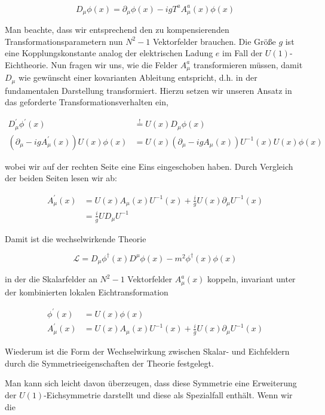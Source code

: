 \documentclass[10pt, letterpaper]{article}
\begin{document}
$$
D_{\mu} \phi(x)=\partial_{\mu} \phi(x)-i g T^{a} A_{\mu}^{a}(x) \phi(x)
$$

Man beachte, dass wir entsprechend den zu kompensierenden Transformationsparametern nun $N^{2}-1$ Vektorfelder brauchen. Die Größe $g$ ist eine Kopplungskonstante analog der elektrischen Ladung $e$ im Fall der $U(1)$-Eichtheorie. Nun fragen wir uns, wie die Felder $A_{\mu}^{a}$ transformieren müssen, damit $D_{\mu}$ wie gewünscht einer kovarianten Ableitung entspricht, d.h. in der fundamentalen Darstellung transformiert. Hierzu setzen wir unseren Ansatz in das geforderte Transformationsverhalten ein,

$$
\begin{aligned}
D_{\mu}^{\prime} \phi^{\prime}(x) & \stackrel{!}{=} U(x) D_{\mu} \phi(x) \\
\left(\partial_{\mu}-i g A_{\mu}^{\prime}(x)\right) U(x) \phi(x) & =U(x)\left(\partial_{\mu}-i g A_{\mu}(x)\right) U^{-1}(x) U(x) \phi(x)
\end{aligned}
$$

wobei wir auf der rechten Seite eine Eins eingeschoben haben. Durch Vergleich der beiden Seiten lesen wir ab:

$$
\begin{aligned}
A_{\mu}^{\prime}(x) & =U(x) A_{\mu}(x) U^{-1}(x)+\frac{i}{g} U(x) \partial_{\mu} U^{-1}(x) \\
& =\frac{i}{g} U D_{\mu} U^{-1}
\end{aligned}
$$

Damit ist die wechselwirkende Theorie

$$
\mathscr{L}=D_{\mu} \phi^{\dagger}(x) D^{\mu} \phi(x)-m^{2} \phi^{\dagger}(x) \phi(x)
$$

in der die Skalarfelder an $N^{2}-1$ Vektorfelder $A_{\mu}^{a}(x)$ koppeln, invariant unter der kombinierten lokalen Eichtransformation

$$
\begin{aligned}
\phi^{\prime}(x) & =U(x) \phi(x) \\
A_{\mu}^{\prime}(x) & =U(x) A_{\mu}(x) U^{-1}(x)+\frac{i}{g} U(x) \partial_{\mu} U^{-1}(x)
\end{aligned}
$$

Wiederum ist die Form der Wechselwirkung zwischen Skalar- und Eichfeldern durch die Symmetrieeigenschaften der Theorie festgelegt.

Man kann sich leicht davon überzeugen, dass diese Symmetrie eine Erweiterung der $U(1)$-Eichsymmetrie darstellt und diese als Spezialfall enthält. Wenn wir die
\end{document}
